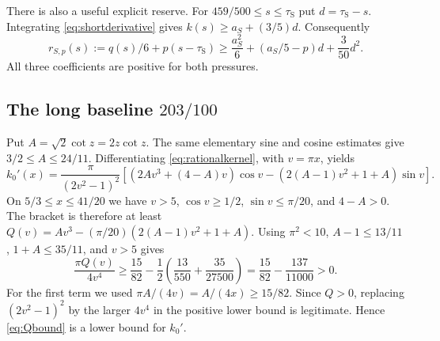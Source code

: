 \documentclass[11pt]{amsart}
\numberwithin{equation}{section}
\newcommand{\tS}{\tau_{\mathrm S}}
\begin{document}
There is also a useful explicit reserve. For
$459/500\leq s\leq\tS$ put $d=\tS-s$. Integrating
\eqref{eq:shortderivative} gives $k(s)\geq a_S+(3/5)d$.
Consequently
\begin{equation}\label{eq:shortreserve}
 r_{S,p}(s):=q(s)/6+p(s-\tS)
 \geq\frac{a_S^2}{6}+(a_S/5-p)d+\frac3{50}d^2.
\end{equation}
All three coefficients are positive for both pressures.

\subsection{The long baseline $203/100$}

Put $A=\sqrt2\cot z=2z\cot z$. The same elementary sine and
cosine estimates give $3/2\leq A\leq24/11$. Differentiating
\eqref{eq:rationalkernel}, with $v=\pi x$, yields
\begin{equation}\label{eq:k0longderivative}
 k_0'(x)=\frac{\pi}{(2v^2-1)^2}
 \left[(2Av^3+(4-A)v)\cos v
       -(2(A-1)v^2+1+A)\sin v\right].
\end{equation}
On $5/3\leq x\leq41/20$ we have $v>5$, $\cos v\geq1/2$,
$\sin v\leq\pi/20$, and $4-A>0$. The bracket is therefore at
least
$Q(v)=Av^3-(\pi/20)(2(A-1)v^2+1+A)$.
Using $\pi^2<10$, $A-1\leq13/11$, $1+A\leq35/11$, and $v>5$
gives
\begin{equation}\label{eq:Qbound}
 \frac{\pi Q(v)}{4v^4}
 \geq\frac{15}{82}-\frac12\left(\frac{13}{550}
                                      +\frac{35}{27500}\right)
 =\frac{15}{82}-\frac{137}{11000}>0.
\end{equation}
For the first term we used
$\pi A/(4v)=A/(4x)\geq15/82$. Since $Q>0$, replacing
$(2v^2-1)^2$ by the larger $4v^4$ in the positive lower bound is
legitimate. Hence \eqref{eq:Qbound} is a lower bound for $k_0'$.
\end{document}
